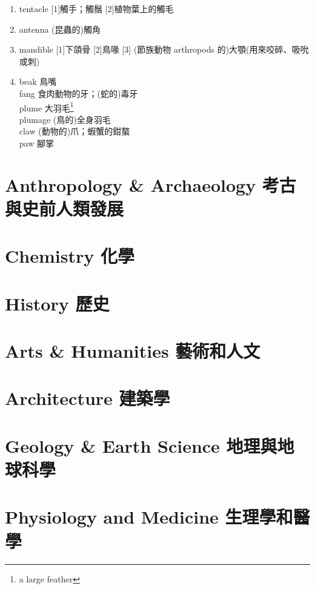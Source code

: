 \documentclass[twoside,b5paper]{book}
\begin{document}
\begin{enumerate}
      flock 較小的家畜或鳥類之同食同飛者\\
      pack 指聚群獵食的野獸\footnote{suggest animals hunting in company}\\
      school 指數目繁多的魚\\
    \item
      tentacle [1]觸手；觸鬚 [2]植物葉上的觸毛
    \item
      antenna  (昆蟲的)觸角
    \item
      mandible  [1]下頜骨 [2]鳥喙 [3] (節族動物 arthropods 的)大顎(用來咬碎、吸吮或刺)
    \item
      beak  鳥嘴\\
      fang 食肉動物的牙；(蛇的)毒牙\\
      plume  大羽毛\footnote{a large feather}\\
      plumage  (鳥的)全身羽毛\\
      claw  (動物的)爪；蝦蟹的鉗螯\\
      paw  腳掌
  \end{enumerate}

  \chapter{Anthropology \& Archaeology 考古與史前人類發展}

  \chapter{Chemistry 化學}

  \chapter{History 歷史}

  \chapter{Arts \& Humanities 藝術和人文}

  \chapter{Architecture 建築學}

  \chapter{Geology \& Earth Science 地理與地球科學}

  \chapter{Physiology and Medicine 生理學和醫學}
\end{document}

